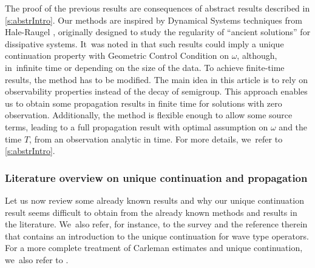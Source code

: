 \documentclass[10pt]{amsart}
\theoremstyle{definition}
\begin{document}
The proof of the previous results are consequences of abstract results described in \cref{s:abstrIntro}. Our methods are inspired by Dynamical Systems techniques from Hale-Raugel \cite{HR03}, originally designed to study the regularity of ``ancient solutions'' for dissipative systems. It~was noted in \cite{JL13} that such results could imply a unique continuation property with Geometric Control Condition on $\omega$, although, in~infinite time or depending on the size of the data. To achieve finite-time results, the method has to be modified. The main idea in this article is to rely on observability properties instead of the decay of semigroup. This approach enables us to obtain some propagation results in finite time for solutions with zero observation. Additionally, the method is flexible enough to allow some source terms, leading to a full propagation result with optimal assumption on $\omega$ and the time $T$, from an observation analytic in time. For more details, we~refer to \cref{s:abstrIntro}.
\subsubsection*{Literature overview on unique continuation and propagation} Let us now review some already known results and why our unique continuation result seems difficult to obtain from the already known methods and results in the literature. We~also refer, for instance, to the survey \cite{LL:23Lecture} and the reference therein that contains an introduction to the unique continuation for wave type operators. For a more complete treatment of Carleman estimates and unique continuation, we~also refer to \cite{LernerBook19}.
\end{document}
